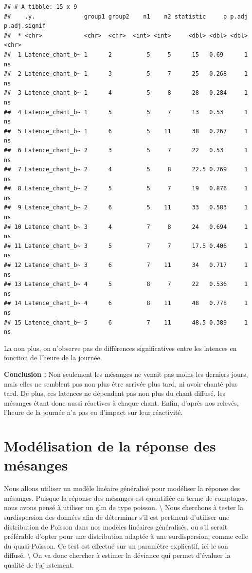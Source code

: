 \documentclass[
  french,
]{article}
\begin{document}
\begin{verbatim}
## # A tibble: 15 x 9
##    .y.              group1 group2    n1    n2 statistic     p p.adj p.adj.signif
##  * <chr>            <chr>  <chr>  <int> <int>     <dbl> <dbl> <dbl> <chr>       
##  1 Latence_chant_b~ 1      2          5     5      15   0.69      1 ns          
##  2 Latence_chant_b~ 1      3          5     7      25   0.268     1 ns          
##  3 Latence_chant_b~ 1      4          5     8      28   0.284     1 ns          
##  4 Latence_chant_b~ 1      5          5     7      13   0.53      1 ns          
##  5 Latence_chant_b~ 1      6          5    11      38   0.267     1 ns          
##  6 Latence_chant_b~ 2      3          5     7      22   0.53      1 ns          
##  7 Latence_chant_b~ 2      4          5     8      22.5 0.769     1 ns          
##  8 Latence_chant_b~ 2      5          5     7      19   0.876     1 ns          
##  9 Latence_chant_b~ 2      6          5    11      33   0.583     1 ns          
## 10 Latence_chant_b~ 3      4          7     8      24   0.694     1 ns          
## 11 Latence_chant_b~ 3      5          7     7      17.5 0.406     1 ns          
## 12 Latence_chant_b~ 3      6          7    11      34   0.717     1 ns          
## 13 Latence_chant_b~ 4      5          8     7      22   0.536     1 ns          
## 14 Latence_chant_b~ 4      6          8    11      48   0.778     1 ns          
## 15 Latence_chant_b~ 5      6          7    11      48.5 0.389     1 ns
\end{verbatim}

La non plus, on n'observe pas de différences significatives entre les
latences en fonction de l'heure de la journée.

\textbf{Conclusion :} Non seulement les mésanges ne venait pas moins les
derniers jours, mais elles ne semblent pas non plus être arrivée plus
tard, ni avoir chanté plus tard. De plus, ces latences ne dépendent pas
non plus du chant diffusé, les mésanges étant donc aussi réactives à
chaque chant. Enfin, d'après nos relevés, l'heure de la journée n'a pas
eu d'impact sur leur réactivité.

\newpage

\section{Modélisation de la réponse des
mésanges}\label{moduxe9lisation-de-la-ruxe9ponse-des-muxe9sanges}

Nous allons utiliser un modèle linéaire généralisé pour modéliser la
réponse des mésanges. Puisque la réponse des mésanges est quantifiée en
terme de comptages, nous avons pensé à utiliser un glm de type poisson.
\textbackslash{} Nous cherchons à tester la surdispersion des données
afin de déterminer s'il est pertinent d'utiliser une distribution de
Poisson dans nos modèles linéaires généralisés, ou s'il serait
préférable d'opter pour une distribution adaptée à une surdispersion,
comme celle du quasi-Poisson. Ce test est effectué sur un paramètre
explicatif, ici le son diffusé. \textbackslash{} On va donc chercher à
estimer la déviance qui permet d'évaluer la qualité de l'ajustement.
\end{document}
